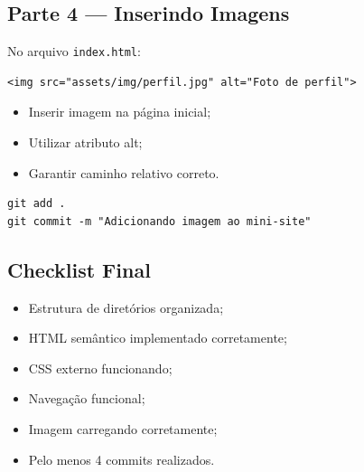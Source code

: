 \documentclass[12pt,a4paper]{article}
\begin{document}

\subsection{Parte 4 — Inserindo Imagens}
No arquivo \texttt{index.html}:

\begin{boxCodigo}
\begin{verbatim}
<img src="assets/img/perfil.jpg" alt="Foto de perfil">
\end{verbatim}
\end{boxCodigo}

\begin{boxAtividade}

\begin{itemize}
\item Inserir imagem na página inicial;
\item Utilizar atributo alt;
\item Garantir caminho relativo correto.
\end{itemize}

\end{boxAtividade}

\begin{boxAtividade}

\begin{boxCodigo}
\begin{verbatim}
git add .
git commit -m "Adicionando imagem ao mini-site"
\end{verbatim}
\end{boxCodigo}

\end{boxAtividade}


\subsection{Checklist Final}

\begin{boxAtividade}

\begin{itemize}
\item Estrutura de diretórios organizada;
\item HTML semântico implementado corretamente;
\item CSS externo funcionando;
\item Navegação funcional;
\item Imagem carregando corretamente;
\item Pelo menos 4 commits realizados.
\end{itemize}

\end{boxAtividade}
\end{document}
